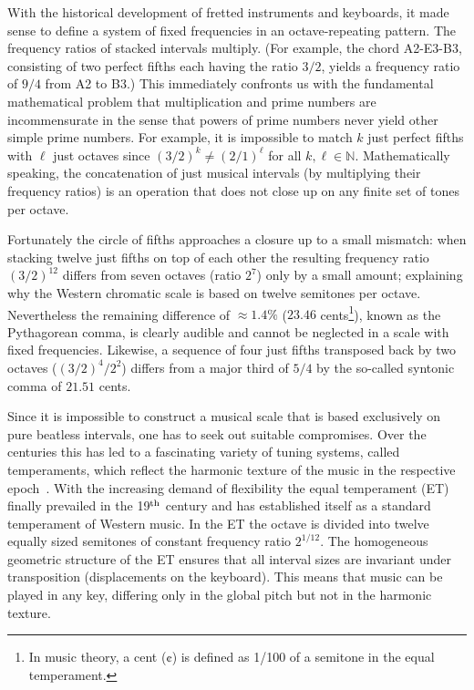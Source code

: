 With the historical development of fretted instruments and keyboards, it made sense to define a system of fixed frequencies in an octave-repeating pattern. The frequency ratios of stacked intervals multiply. (For example, the chord A2-E3-B3, consisting of two perfect fifths each having the ratio $3/2$, yields a frequency ratio of $9/4$ from A2 to B3.) This immediately confronts us with the fundamental mathematical problem that multiplication and prime numbers are incommensurate in the sense that powers of prime numbers never yield other simple prime numbers. For example, it is impossible to match $k$ just perfect fifths with $\ell$ just octaves since $(3/2)^k \neq (2/1)^\ell$ for all $k,\ell\in \mathbb{N}$. Mathematically speaking, the concatenation of just musical intervals (by multiplying their frequency ratios) is an operation that does not close up on any finite set of tones per octave.

Fortunately the circle of fifths approaches a closure up to a small mismatch: when stacking twelve just fifths on top of each other the resulting frequency ratio $(3/2)^{12}$ differs from seven octaves (ratio $2^7$) only by a small amount; explaining why the Western chromatic scale is based on twelve semitones per octave. Nevertheless the remaining difference of $\approx 1.4\%$ ($23.46$ cents\footnote{In music theory, a cent ($\cent$) is defined as 1/100 of a semitone in the equal temperament.}), known as the Pythagorean comma, is clearly audible and cannot be neglected in a scale with fixed frequencies.  Likewise, a sequence of four just fifths transposed back by two octaves ($(3/2)^4/2^2$) differs from a major third of $5/4$ by the so-called syntonic comma of $21.51$ cents.

Since it is impossible to construct a musical scale that is based exclusively on pure beatless intervals, one has to seek out suitable compromises. Over the centuries this has led to a fascinating variety of tuning systems, called temperaments, which reflect the harmonic texture of the music in the respective epoch~\cite{Barbour}. With the increasing demand of flexibility the equal temperament (ET) finally prevailed in the 19$^{\rm th}$ century and has established itself as a standard temperament of Western music. In the ET the octave is divided into twelve equally sized semitones of constant frequency ratio $2^{1/12}$. The homogeneous geometric structure of the ET ensures that all interval sizes are invariant under transposition (displacements on the keyboard). This means that music can be played in any key, differing only in the global pitch but not in the harmonic texture. 

